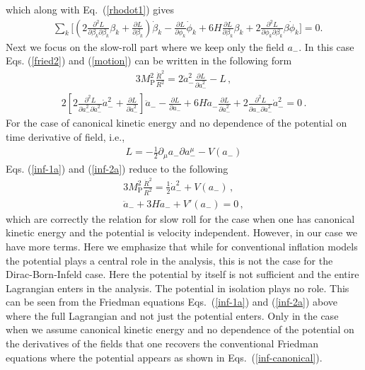 \documentclass[a4paper,11pt]{article}
\def\non{\nonumber\\}
\def\non{\nonumber\\}
\begin{document}
  which along with Eq.~(\ref{rhodot1}) gives
  \begin{align}
    &\sum_{k}\Big[ \left(2 \frac{\partial^2 L}{\partial \beta_k \partial \beta_k} \beta_k + \frac{\partial L}{\partial \beta_k}
    \right)\dot \beta_k
    - \frac{\partial L}{\partial \phi_k} \dot \phi_k + 6H \frac{\partial L}{\partial \beta_k} \beta_k
    + 2 \frac{\partial^2 L}{\partial \phi_k\partial \beta_k} \beta\dot \phi_k \Big]=0.
    \label{motion}
  \end{align}
  Next we focus on the slow-roll part where we keep only the field $a_-$. In this case Eqs. (\ref{fried2}) and (\ref{motion}) can be written in
  the following form
  \begin{align}
    3 M_\text{P}^2 \frac{\dot R^2}{R^2} = 2 \dot a_{-}^2 \frac{\partial L}{\partial \dot a_{-}^2} - L\,,
    \label{inf-1a}
  \end{align}
  \begin{align}
    2 \left[2 \frac{\partial^2 L}{\partial \dot a_{-}^2 \partial \dot a_{-}^2} \dot a_{-}^2 + \frac{\partial L}{\partial \dot a_{-}^2}
    \right] \ddot a_{-} -
    \frac{\partial L}{\partial a_{-}} + 6H \dot a_{-} \frac{\partial L}{\partial \dot a_{-}^2}
    + 2 \frac{\partial^2 L}{\partial a_{-} \partial \dot a_{-}^2} \dot a_{-}^2
    =0
    \label{inf-2a}\,.
  \end{align}
  For the case of canonical kinetic energy and no dependence of the potential on time derivative of field, i.e.,
  \begin{align}
    L= -\frac{1}{2} \partial_\mu a_{-}\partial a_{-}^{\mu} - V(a_-)
  \end{align}
  Eqs. (\ref{inf-1a}) and  (\ref{inf-2a}) 
   reduce to the following
  \begin{align} \label{inf-canonical}
    3 M_\text{P}^2 \frac{\dot R^2}{R^2} = \frac{1}{2} \dot a_{-}^2 + V(a_-)\,,\non
    \ddot a_{-} + 3 H \dot a_{-} + V'(a_{-})=0\,,
  \end{align}
  which are correctly the relation for slow roll for the case when one has canonical kinetic energy and the potential
  is velocity independent. However, in our case we have more terms.
  Here we emphasize that while for
  conventional inflation models the potential plays a central role in the analysis, this is not the case for the Dirac-Born-Infeld case.
  Here the potential by itself is not sufficient and the entire Lagrangian enters in the analysis.
  The potential in isolation plays no role. This can be seen from the Friedman equations
  Eqs.~(\ref{inf-1a}) and (\ref{inf-2a}) above where the full Lagrangian and not just the potential
  enters. Only in the case when we assume canonical kinetic energy and no dependence of the
  potential on the derivatives of the fields that one recovers the conventional Friedman equations
  where the potential appears as shown in Eqs.~(\ref{inf-canonical}).
\end{document}
